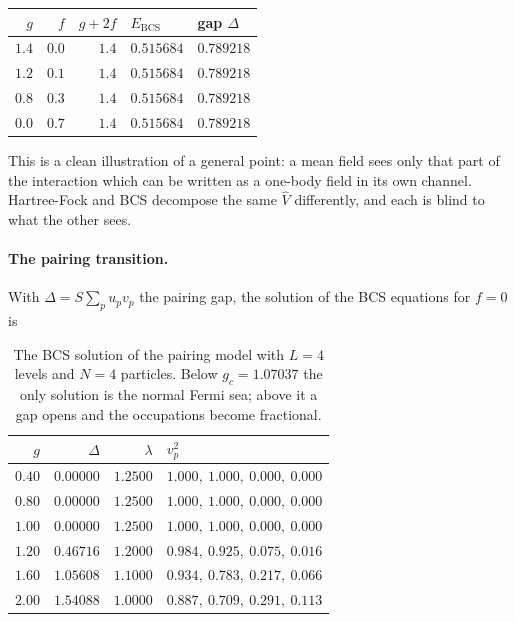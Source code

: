\begin{center}
\renewcommand{\arraystretch}{1.2}
\begin{tabular}{rrrll}
\toprule
$g$ & $f$ & $g+2f$ & $E_{\mathrm{BCS}}$ & gap $\Delta$\\
\midrule
$1.4$ & $0.0$ & $1.4$ & $0.515684$ & $0.789218$\\
$1.2$ & $0.1$ & $1.4$ & $0.515684$ & $0.789218$\\
$0.8$ & $0.3$ & $1.4$ & $0.515684$ & $0.789218$\\
$0.0$ & $0.7$ & $1.4$ & $0.515684$ & $0.789218$\\
\bottomrule
\end{tabular}
\end{center}

This is a clean illustration of a general point: a mean field sees only that
part of the interaction which can be written as a one-body field in its own
channel.  Hartree-Fock and BCS decompose the same $\hat{V}$ differently, and
each is blind to what the other sees.

\paragraph{The pairing transition.}
With $\Delta=S\sum_p u_pv_p$ the pairing gap, the solution of the BCS
equations for $f=0$ is

\begin{table}[h]
\centering
\renewcommand{\arraystretch}{1.25}
\setlength{\tabcolsep}{10pt}
\begin{tabular}{rrrl}
\toprule
$g$ & $\Delta$ & $\lambda$ & $v_p^2$\\
\midrule
$0.40$ & $0.00000$ & $1.2500$ & $1.000,\ 1.000,\ 0.000,\ 0.000$\\
$0.80$ & $0.00000$ & $1.2500$ & $1.000,\ 1.000,\ 0.000,\ 0.000$\\
$1.00$ & $0.00000$ & $1.2500$ & $1.000,\ 1.000,\ 0.000,\ 0.000$\\
$1.20$ & $0.46716$ & $1.2000$ & $0.984,\ 0.925,\ 0.075,\ 0.016$\\
$1.60$ & $1.05608$ & $1.1000$ & $0.934,\ 0.783,\ 0.217,\ 0.066$\\
$2.00$ & $1.54088$ & $1.0000$ & $0.887,\ 0.709,\ 0.291,\ 0.113$\\
\bottomrule
\end{tabular}
\caption{The BCS solution of the pairing model with $L=4$ levels and $N=4$
particles.  Below $g_c=1.07037$ the only solution is the normal Fermi sea;
above it a gap opens and the occupations become fractional.}
\label{tab:bcsgap}
\end{table}


